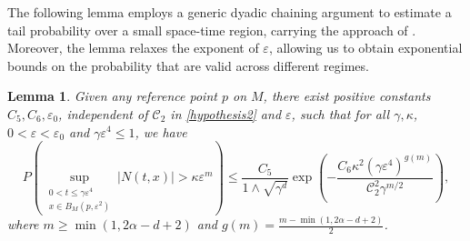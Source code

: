 \documentclass[12pt]{amsart}
\newtheorem{lemma}{Lemma}[section]
\numberwithin{equation}{section}
\newcommand{\1}{\mathbf{1}}
\begin{document}
The following lemma employs a generic dyadic chaining argument to estimate a tail probability over a small space-time region, carrying the approach of \cite{athreya2021small}. Moreover, the lemma relaxes the exponent of $\varepsilon$, allowing us to obtain exponential bounds on the probability that are valid across different regimes.
\begin{lemma}\label{larged}Given any reference point $p$ on $M$, there exist positive constants $C_5,C_6,\varepsilon_0$, independent of $\mathcal{C}_2$ in \eqref{hypothesis2} and $\varepsilon$, such that for all $\gamma,\kappa$, $0<\varepsilon<\varepsilon_0$ and $\gamma\varepsilon^4\leq 1$, we have
\begin{equation*}
P\left(\sup_{\substack{0<t\leq\gamma\varepsilon^4\\ x\in B_M\left(p,\varepsilon^2\right)}}\vert N(t,x)\vert>\kappa\varepsilon^{m}\right)\leq \frac{C_5}{1\wedge \sqrt{\gamma^d}}\exp\left(-\frac{C_6\kappa^2(\gamma\varepsilon^4)^{g(m)}}{\mathcal{C}_2^2\gamma^{m/2}}\right),
\end{equation*}
where $m\geq \min(1,2\alpha-d+2)$ and $g(m) = \frac{m-\min(1,2\alpha-d+2)}{2}$.
\end{lemma}
\end{document}
